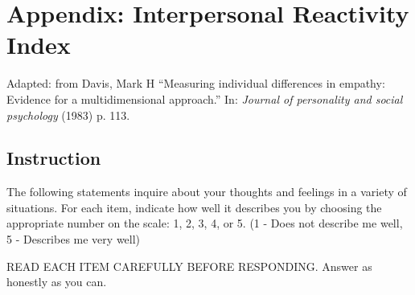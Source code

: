 \chapter{Appendix: Interpersonal Reactivity Index}
\label{chap_app_iri}
Adapted: from Davis, Mark H ``Measuring individual differences in empathy: Evidence for a multidimensional approach.'' In: \textit{Journal of personality and social psychology} (1983) p. 113.

\section{Instruction}
The following statements inquire about your thoughts and feelings in a variety of situations. For  each item, indicate how well it describes you by choosing the appropriate number on the scale: 1, 2, 3, 4, or 5. (1 - Does not describe me well, 5 - Describes me very well)

READ EACH ITEM CAREFULLY BEFORE RESPONDING. Answer as honestly as you can.

